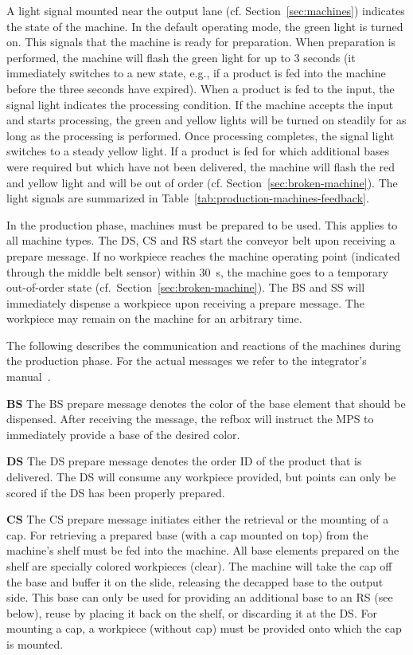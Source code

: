 \documentclass[12pt,twoside]{article}
\newcommand{\refsec}[1]{Section~\ref{#1}}
\newcommand{\reftab}[1]{Table~\ref{#1}}
\begin{document}
A light signal mounted near the output lane
(cf. \refsec{sec:machines}) indicates the state of the machine. In the
default operating mode, the green light is turned on. This signals
that the machine is ready for preparation. When preparation is performed,
the machine will flash the green light for up to 3 seconds (it
immediately switches to a new state, e.g., if a product is fed into the
machine before the three seconds have expired). When a product is fed
to the input, the signal light indicates the processing condition. If
the machine accepts the input and starts processing, the green and yellow lights
will be turned on steadily for as long as the processing is
performed. Once processing completes, the signal light switches to a
steady yellow light. If a product is fed for which additional bases
were required but which have not been delivered, the machine will
flash the red and yellow light and will be out of order
(cf. \refsec{sec:broken-machine}). The light signals are summarized in
\reftab{tab:production-machines-feedback}.

In the production phase, machines must be prepared to be used. This
applies to all machine types.  The DS, CS and RS start the conveyor
belt upon receiving a prepare message. If no workpiece reaches the
machine operating point (indicated through the middle belt sensor)
within \SI{30}{\second}, the machine goes to a temporary out-of-order
state (cf.~\refsec{sec:broken-machine}). The BS and SS will
immediately dispense a workpiece upon receiving a prepare message. The
workpiece may remain on the machine for an arbitrary time.

The following describes the communication and reactions of the
machines during the production phase. For the actual messages we refer
to the integrator's manual~\cite{RefBoxIntManual}.

\smallskip

\noindent\textbf{BS}
The BS prepare message denotes the color of the base element that should
be dispensed. After receiving the message, the refbox will instruct
the MPS to immediately provide a base of the desired color.

\noindent\textbf{DS}
The DS prepare message denotes the order ID of the product that is delivered.
The DS will consume any workpiece provided, but points can only be scored if the
DS has been properly prepared.

\noindent\textbf{CS}
The CS prepare message initiates either the retrieval or the mounting of
a cap. For retrieving a prepared base (with a cap mounted on top) from
the machine's shelf must be fed into the machine. All base elements
prepared on the shelf are specially colored workpieces (clear). The
machine will take the cap off the base and buffer it on the slide,
releasing the decapped base to the output side. This base can only be
used for providing an additional base to an RS (see below), reuse by
placing it back on the shelf, or discarding it at the DS\@.  For
mounting a cap, a workpiece (without cap) must be provided onto which
the cap is mounted.
\end{document}
